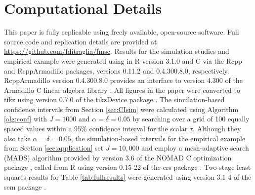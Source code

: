 \section{Computational Details}
\label{append:comp}
This paper is fully replicable using freely available, open-source software.
Full source code and replication details are provided at \url{https://github.com/fditraglia/fmsc}.
Results for the simulation studies and empirical example were generated using in R version 3.1.0 \citep{R} and C\raisebox{0.5ex}{\tiny\textbf{++}} via the Rcpp \citep{RcppArticle,RcppBook} and RcppArmadillo \citep{RcppArmadillo} packages, versions 0.11.2 and 0.4.300.8.0, respectively.
RcppArmadillo version 0.4.300.8.0 provides an interface to version 4.300 of the Armadillo C\raisebox{0.5ex}{\tiny\textbf{++}} linear algebra library \citep{Armadillo}.
All figures in the paper were converted to tikz using version 0.7.0 of the tikzDevice package \citep{tikzDevice}.
The simulation-based confidence intervals from Section \ref{sec:CIsim} were calculated using Algorithm \ref{alg:conf} with $J = 1000$ and $\alpha = \delta = 0.05$ by searching over a grid of 100 equally spaced values within a 95\% confidence interval for the scalar $\tau$.
Although they also take $\alpha = \delta = 0.05$, the simulation-based intervals for the empirical example from Section \ref{sec:application} set $J = 10,000$ and employ a mesh-adaptive search (MADS) algorithm provided by version 3.6 of the NOMAD C\raisebox{0.5ex}{\tiny\textbf{++}} optimization package \citep{NOMADalgorithm,NOMADcode,NOMADuserguide}, called from R using version 0.15-22 of the crs package \citep{crs}.
Two-stage least squares results for Table \ref{tab:fullresults} were generated using version 3.1-4 of the sem package \citep{sem}.